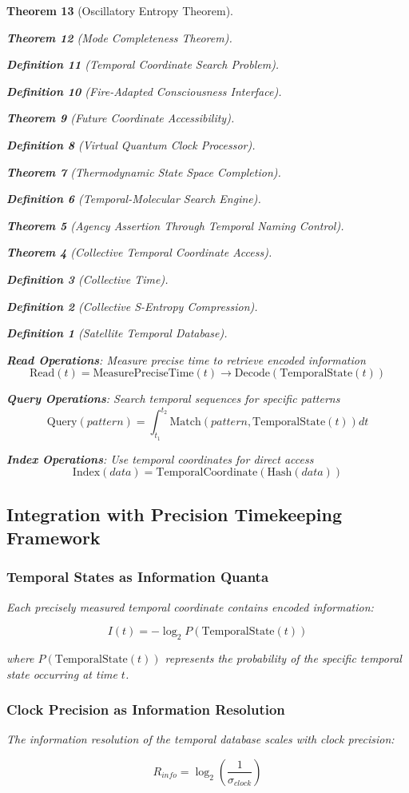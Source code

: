 \documentclass[12pt,a4paper]{article}
\newtheorem{theorem}{Theorem}[section]
\newtheorem{definition}[theorem]{Definition}
\begin{document}
\begin{theorem}[Oscillatory Entropy Theorem]
\begin{theorem}[Mode Completeness Theorem]
\begin{enumerate}
\begin{definition}[Temporal Coordinate Search Problem]
\begin{algorithm}
\begin{definition}[Fire-Adapted Consciousness Interface]
\begin{theorem}[Future Coordinate Accessibility]
\begin{definition}[Virtual Quantum Clock Processor]
\begin{itemize}
\begin{itemize}
\begin{theorem}[Thermodynamic State Space Completion]
\begin{definition}[Temporal-Molecular Search Engine]
\begin{theorem}[Agency Assertion Through Temporal Naming Control]
\begin{remark}
\begin{theorem}[Collective Temporal Coordinate Access]
\begin{definition}[Collective Time]
\begin{definition}[Collective S-Entropy Compression]
\begin{definition}[Satellite Temporal Database]
\begin{algorithm}
\begin{table}[h]
{{\textbf{Read Operations}: Measure precise time to retrieve encoded information
$$\text{Read}(t) = \text{MeasurePreciseTime}(t) \rightarrow \text{Decode}(\text{TemporalState}(t))$$

\textbf{Query Operations}: Search temporal sequences for specific patterns
$$\text{Query}(pattern) = \int_{t_1}^{t_2} \text{Match}(pattern, \text{TemporalState}(t)) dt$$

\textbf{Index Operations}: Use temporal coordinates for direct access
$$\text{Index}(data) = \text{TemporalCoordinate}(\text{Hash}(data))$$

\subsection{Integration with Precision Timekeeping Framework}

\subsubsection{Temporal States as Information Quanta}

Each precisely measured temporal coordinate contains encoded information:

\begin{equation}
I(t) = -\log_2 P(\text{TemporalState}(t))
\end{equation}

where $P(\text{TemporalState}(t))$ represents the probability of the specific temporal state occurring at time $t$.

\subsubsection{Clock Precision as Information Resolution}

The information resolution of the temporal database scales with clock precision:

\begin{equation}
R_{info} = \log_2\left(\frac{1}{\sigma_{clock}}\right)
\end{equation}

}}
\end{table}
\end{algorithm}
\end{definition}
\end{definition}
\end{definition}
\end{theorem}
\end{remark}
\end{theorem}
\end{definition}
\end{theorem}
\end{itemize}
\end{itemize}
\end{definition}
\end{theorem}
\end{definition}
\end{algorithm}
\end{definition}
\end{enumerate}
\end{theorem}
\end{theorem}
\end{document}
